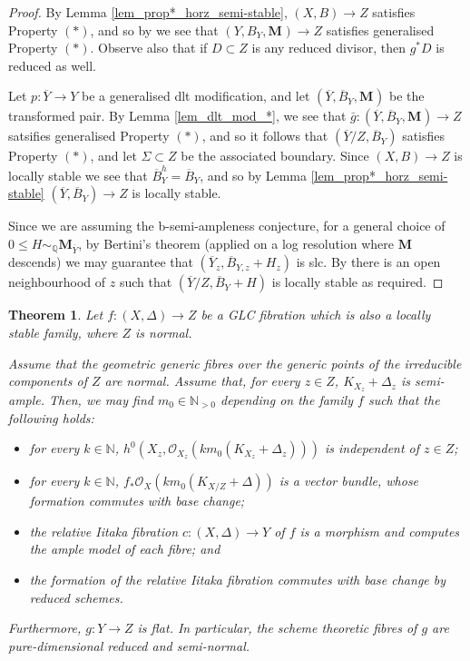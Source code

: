 \documentclass[12pt]{amsart}
\theoremstyle{plain}
\newtheorem{theorem}{Theorem}[section]
\theoremstyle{definition}
\def\rar{\rightarrow}
\def\bM#1.{\mathbf{M}_{#1}}
\def\K#1.{K_{#1}}
\def\subs#1.{_{#1}}
\begin{document}
\begin{proof}
By Lemma \ref{lem_prop*_horz_semi-stable}, 
$(X, B)\rightarrow Z$ satisfies Property $(*)$, and so by \cite[Theorem 3.1]{Ambro04}
we see that $(Y, B_Y,\bM.)\rightarrow Z$ satisfies generalised Property $(*)$.  
Observe also that if $D \subset Z$ is any reduced divisor, then $g^*D$ is reduced as well.

Let $p\colon \overline{Y}\rightarrow Y$ be a generalised dlt modification, and
let $(\overline{Y}, \overline{B}_Y,\bM.)$ be the transformed pair. 
By Lemma \ref{lem_dlt_mod_*}, we see that $\bar{g}\colon (\overline{Y}, \overline{B}_Y,\bM.) \rightarrow Z$ 
satsifies generalised Property $(*)$, and so it follows that  
$(\overline{Y}/Z, \overline{B}_Y)$ 
satisfies Property $(*)$, and 
let $\Sigma \subset Z$ be the associated boundary.
Since $(X, B) \rightarrow Z$ is locally stable we see
that $\overline{B}_Y^h = \overline{B}_Y$, 
and so by Lemma \ref{lem_prop*_horz_semi-stable} 
$(\overline{Y}, \overline{B}_Y) \rightarrow Z$ is locally stable.

Since we are assuming the b-semi-ampleness conjecture, 
for a general choice of $0 \leq H \sim_{\mathbb Q} \bM \overline{Y}.$, by Bertini's theorem
(applied on a log resolution where $\bM.$ descends) we may guarantee that 
$(\overline{Y}_z, \overline{B}_{Y, z}+H_z)$
is slc. By \cite[Corollary 4.45]{Kollar21} there is an open neighbourhood of $z$ 
such that $(\overline{Y}/Z, \overline{B}_Y+H)$ is locally stable as required.
\end{proof}




\begin{theorem} \label{thm_iitaka}
Let $f \colon (X,\Delta) \rar Z$ be a GLC fibration which is also a locally stable family, where $Z$ is normal.

Assume that the geometric generic fibres over the generic points of the irreducible components of $Z$ are normal.
Assume that, for every $z \in Z$, $\K X_z. + \Delta_z$ is semi-ample.
Then, we may find $m_0 \in \mathbb N_{>0}$ depending on the family $f$ such that the following holds:
\begin{itemize}
    \item[(1)] for every $k \in \mathbb N$, 
	$h^0(X_z,\mathcal{O}\subs X_z. (km_0( \K X_z. + \Delta_z)))$ is independent of $z \in Z$;
    \item[(2)] for every $k \in \mathbb N$, $f_*\mathcal{O}\subs X. (km_0( \K X/Z. + \Delta))$ 
is a vector bundle, whose formation commutes with base change;
    \item[(3)] the relative Iitaka fibration $c \colon (X,\Delta) \rar Y$ of $f$ is a morphism and computes the ample model of each fibre; and
    \item[(4)] the formation of the relative Iitaka fibration commutes with base change by reduced schemes.
\end{itemize}
Furthermore, $g \colon Y \rar Z$ is flat.
In particular, the scheme theoretic fibres of $g$ are pure-dimensional reduced and semi-normal.
\end{theorem}
\end{document}
